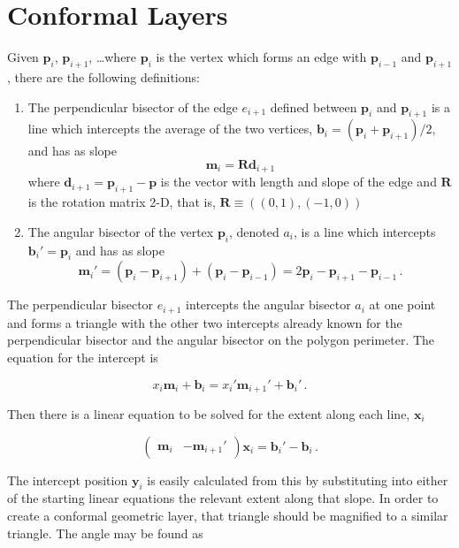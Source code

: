 \documentclass{article}
\begin{document}
\section{Conformal Layers}

Given $\mathbf{p}_i$, $\mathbf{p}_{i+1}$, \ldots where $\mathbf{p}_i$ is the vertex which forms an edge with $\mathbf{p}_{i-1}$ and $\mathbf{p}_{i+1}$, there are the following definitions:

\begin{enumerate}
    \item The perpendicular bisector of the edge $e_{i+1}$ defined between $\mathbf{p}_i$ and $\mathbf{p}_{i+1}$ is a line which intercepts the average of the two vertices, $\mathbf{b}_i = (\mathbf{p}_i + \mathbf{p}_{i+1})/2$, and has as slope $$\mathbf{m}_i = \mathbf{R}\mathbf{d}_{i+1}$$ where $\mathbf{d}_{i+1} = \mathbf{p}_{i+1} - \mathbf{p}$ is the vector with length and slope of the edge and $\mathbf{R}$ is the rotation matrix 2-D, that is, $\mathbf{R} \equiv ((0,1),(-1,0))$
    \item The angular bisector of the vertex $\mathbf{p}_i$, denoted $a_i$, is a line which intercepts $\mathbf{b}_i' = \mathbf{p}_i$ and has as slope 
        $$ \mathbf{m}_i' = (\mathbf{p}_i - \mathbf{p}_{i+1}) + (\mathbf{p}_i - \mathbf{p}_{i-1})  = 2\mathbf{p}_i - \mathbf{p}_{i+1} - \mathbf{p}_{i-1} \,. $$
\end{enumerate}

The perpendicular bisector $e_{i+1}$ intercepts the angular bisector $a_i$ at one point and forms a triangle with the other two intercepts already known for the perpendicular bisector and the angular bisector on the polygon perimeter. The equation for the intercept is

$$ x_i \mathbf{m}_i + \mathbf{b}_{i} = x_i' \mathbf{m}_{i+1}' + \mathbf{b}_i'\,.$$

Then there is a linear equation to be solved for the extent along each line, $\mathbf{x}_i$

$$ \begin{pmatrix} \mathbf{m}_i & -\mathbf{m}_{i+1}' \end{pmatrix} \mathbf{x}_i = \mathbf{b}_i' - \mathbf{b}_i \,.$$

    The intercept position $\mathbf{y}_i$ is easily calculated from this by substituting into either of the starting linear equations the relevant extent along that slope. In order to create a conformal geometric layer, that triangle should be magnified to a similar triangle. The angle may be found as 
\end{document}
